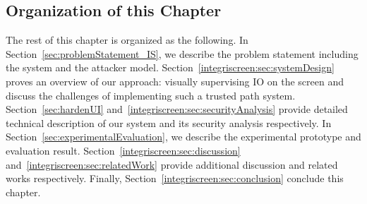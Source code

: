 \subsection{Organization of this Chapter}

The rest of this chapter is organized as the following. In Section~\ref{sec:problemStatement_IS}, we describe the problem statement including the system and the attacker model. Section~\ref{integriscreen:sec:systemDesign} proves an overview of our approach: visually supervising IO on the screen and discuss the challenges of implementing such a trusted path system. Section~\ref{sec:hardenUI} and~\ref{integriscreen:sec:securityAnalysis} provide detailed technical description of our system \integriscreen and its security analysis respectively. In Section~\ref{sec:experimentalEvaluation}, we describe the experimental prototype and evaluation result. Section~\ref{integriscreen:sec:discussion} and~\ref{integriscreen:sec:relatedWork} provide additional discussion and related works respectively. Finally, Section~\ref{integriscreen:sec:conclusion} conclude this chapter. 
